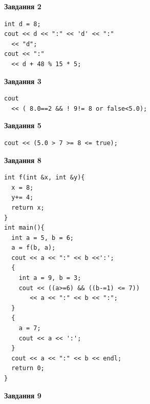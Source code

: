 \documentclass[12pt, ukrainian]{article}
\begin{document}
{\begin {large}
\begin{minipage}[t]{7.0cm}
\end{minipage}
\vline \hspace{1mm}
\begin{minipage}[t]{11.0cm}

\begin{center}
\textbf{Завдання 2}
\end{center}
\vspace{-8mm}

\begin{verbatim}
int d = 8;
cout << d << ":" << 'd' << ":" 
  << "d";
cout << ":" 
  << d + 48 % 15 * 5;
\end{verbatim}



\begin{center}
\textbf{Завдання 3}
\end{center}
\vspace{-8mm}

\begin{verbatim}
cout 
  << ( 8.0==2 && ! 9!= 8 or false<5.0);
\end{verbatim}



\begin{center}
\textbf{Завдання 5}
\end{center}
\vspace{-8mm}

\begin{verbatim}
cout << (5.0 > 7 >= 8 <= true);
\end{verbatim}



\begin{center}
\textbf{Завдання 8}
\end{center}
\vspace{-8mm}

\begin{verbatim}
int f(int &x, int &y){
  x = 8;
  y+= 4;
  return x;
}
int main(){
  int a = 5, b = 6;
  a = f(b, a);
  cout << a << ":" << b <<':';
  {
    int a = 9, b = 3;
    cout << ((a>=6) && ((b-=1) <= 7))
       << a << ":" << b << ":";
  }
  {
    a = 7;
    cout << a << ':';
  }
  cout << a << ":" << b << endl;
  return 0;
}
\end{verbatim}

\end{minipage}


\begin{minipage}[t]{7.0cm}

\begin{center}
\textbf{Завдання 9}
\end{center}
\vspace{-8mm}


\end{minipage}
\end{large}}
\end{document}
